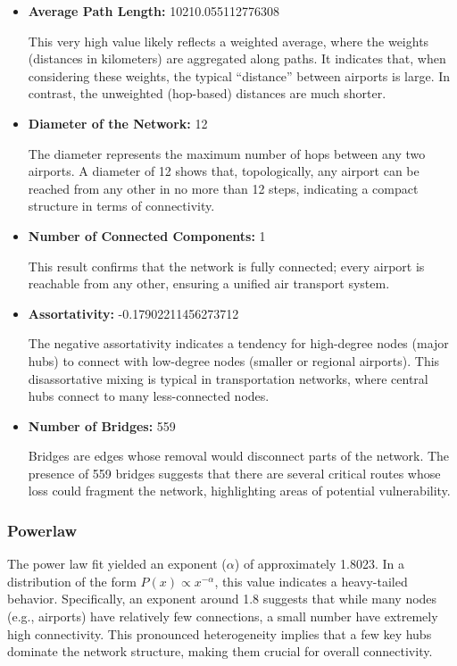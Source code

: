 \documentclass[12pt]{article}
\begin{document}
    \begin{itemize}
        \item \textbf{Average Path Length:} 10210.055112776308

        This very high value likely reflects a weighted average, where the weights (distances in kilometers) are aggregated along paths. It indicates that, when considering these weights, the typical ``distance'' between airports is large. In contrast, the unweighted (hop-based) distances are much shorter.

        \item \textbf{Diameter of the Network:} 12

        The diameter represents the maximum number of hops between any two airports. A diameter of 12 shows that, topologically, any airport can be reached from any other in no more than 12 steps, indicating a compact structure in terms of connectivity.

        \item \textbf{Number of Connected Components:} 1

        This result confirms that the network is fully connected; every airport is reachable from any other, ensuring a unified air transport system.

        \item \textbf{Assortativity:} -0.17902211456273712

        The negative assortativity indicates a tendency for high-degree nodes (major hubs) to connect with low-degree nodes (smaller or regional airports). This disassortative mixing is typical in transportation networks, where central hubs connect to many less-connected nodes.

        \item \textbf{Number of Bridges:} 559

        Bridges are edges whose removal would disconnect parts of the network. The presence of 559 bridges suggests that there are several critical routes whose loss could fragment the network, highlighting areas of potential vulnerability.
    \end{itemize}

    \subsubsection{Powerlaw}
    The power law fit yielded an exponent ($\alpha$) of approximately 1.8023. In a distribution of the form \( P(x) \propto x^{-\alpha} \), this value indicates a heavy-tailed behavior. Specifically, an exponent around 1.8 suggests that while many nodes (e.g., airports) have relatively few connections, a small number have extremely high connectivity. This pronounced heterogeneity implies that a few key hubs dominate the network structure, making them crucial for overall connectivity.
\end{document}

